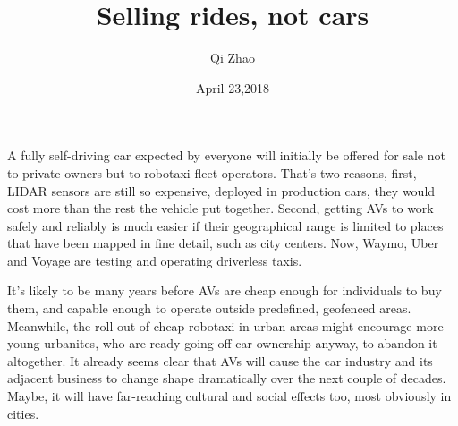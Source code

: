 \documentclass{article}
\author{Qi Zhao}
\date{April 23,2018}
\title{Selling rides, not cars}
\newcommand{\upcite}[1]{\textsuperscript{\textsuperscript{\cite{#1}}}}
\begin{document}
\maketitle
\par A fully self-driving car expected by everyone will initially be offered for sale not to private owners but to robotaxi-fleet operators. That's two reasons, first, LIDAR sensors\upcite{Han2012Enhanced} are still so expensive, deployed in production cars, they would cost more than the rest the vehicle put together. Second, getting AVs to work safely and reliably is much easier if their geographical range is limited to places that have been mapped in fine detail, such as city centers. Now, Waymo, Uber and Voyage are testing and operating driverless taxis.
\par It's likely to be many years before AVs are cheap enough for individuals to buy them, and capable enough to operate outside predefined, geofenced areas. Meanwhile, the roll-out of cheap robotaxi in urban areas might encourage more young urbanites, who are ready going off car ownership anyway, to abandon it altogether. It already seems clear that AVs will cause the car industry and its adjacent business to change shape dramatically over the next couple of decades. Maybe, it will have far-reaching cultural and social effects too, most obviously in cities.
\section*{}


\end{document}
